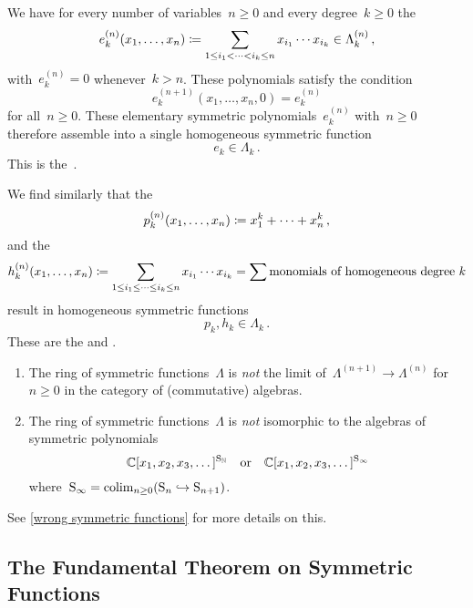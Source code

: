 \documentclass[a4paper,11pt]{scrartcl}
\begin{document}
\begin{example}
  We have for every number of variables~$n \geq 0$ and every degree~$k \geq 0$ the 
  \[
    e^{(n)}_k(x_1, \dotsc, x_n)
    \coloneqq
    \sum_{1 \leq i_1 < \dotsb < i_k \leq n}
    x_{i_1} \dotsm x_{i_k}
    \in
    \Lambda^{(n)}_k \,,
  \]
  with~$e^{(n)}_k = 0$ whenever~$k > n$.
  These polynomials satisfy the condition
  \[
    e^{(n+1)}_k(x_1, \dotsc, x_n, 0)
    =
    e^{(n)}_k
  \]
  for all~$n \geq 0$.
  These elementary symmetric polynomials~$e^{(n)}_k$ with~$n \geq 0$ therefore assemble into a single homogeneous symmetric function
  \[
    e_k \in \Lambda_k \,.
  \]
  This is the~. 

  We find similarly that the 
  \[
    p^{(n)}_k(x_1, \dotsc, x_n)
    \coloneqq
    x_1^k + \dotsb + x_n^k \,,
  \]
  and the 
  \[
    h^{(n)}_k(x_1, \dotsc, x_n)
    \coloneqq
    \sum_{1 \leq i_1 \leq \dotsb \leq i_k \leq n}
    x_{i_1} \dotsm x_{i_k}
    =
    \sum \text{monomials of homogeneous degree~$k$}
  \]
  result in homogeneous symmetric functions
  \[
    p_k, h_k
    \in
    \Lambda_k \,.
  \]
  These are the  and .
\end{example}


\begin{warning}
  \leavevmode
  \begin{enumerate}
    \item
      The ring of symmetric functions~$\Lambda$ is \emph{not} the limit of~$\Lambda^{(n+1)} \to \Lambda^{(n)}$ for~$n \geq 0$ in the category of (commutative) algebras.
    \item
      The ring of symmetric functions~$\Lambda$ is \emph{not} isomorphic to the algebras of symmetric polynomials
      \[
        \mathbb{C}[x_1, x_2, x_3, \dotsc]^{\mathrm{S}_{\mathbb{N}}}
        \quad\text{or}\quad
        \mathbb{C}[x_1, x_2, x_3, \dotsc]^{\mathrm{S}_\infty}
      \]
      where~$\mathrm{S}_\infty = \operatorname*{colim}_{n \geq 0} (\mathrm{S}_n \hookrightarrow \mathrm{S}_{n+1})$.
  \end{enumerate}
  See \cref{wrong symmetric functions} for more details on this.
\end{warning}



\subsection{The Fundamental Theorem on Symmetric Functions}
\end{document}
